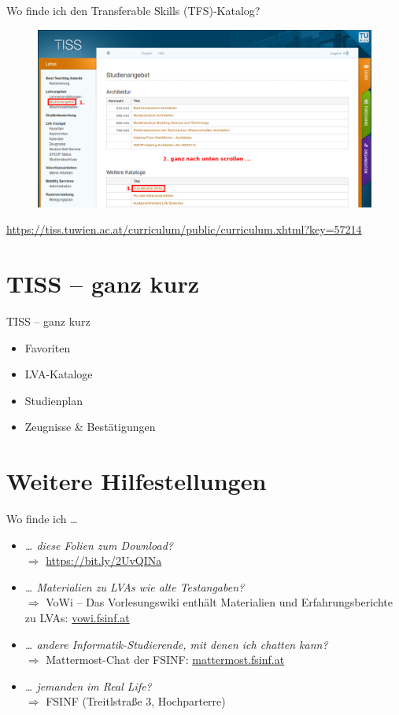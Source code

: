 \documentclass{beamer}
\begin{document}
\begin{frame}{Wo finde ich den Transferable Skills (TFS)-Katalog?}
    \begin{figure}[htp]
        \includegraphics[width=1.0\textwidth]{tiss_tfs.png}
    \end{figure}
     \url{https://tiss.tuwien.ac.at/curriculum/public/curriculum.xhtml?key=57214}
\end{frame}

\section{TISS -- ganz kurz}
\begin{frame}{TISS -- ganz kurz}
    \begin{itemize}
        \item Favoriten
        \item LVA-Kataloge
        \item Studienplan
        \item Zeugnisse \& Bestätigungen
    \end{itemize}
\end{frame}

\section{Weitere Hilfestellungen}
\begin{frame}{Wo finde ich \ldots}
    \begin{itemize}
        \item \textit{\ldots{} diese Folien zum Download?} \\
              $\Rightarrow$ \url{https://bit.ly/2UvQINa}
        \item \textit{\ldots{} Materialien zu LVAs wie alte Testangaben?} \\
              $\Rightarrow$ VoWi -- Das Vorlesungswiki enthält Materialien und
              Erfahrungsberichte zu LVAs: \url{vowi.fsinf.at}
        \item \textit{\ldots{} andere Informatik-Studierende, mit denen ich
              chatten kann?} \\
              $\Rightarrow$ Mattermost-Chat der FSINF: \url{mattermost.fsinf.at}
        \item \textit{\ldots{} jemanden im Real Life?} \\
              $\Rightarrow$ FSINF (Treitlstraße 3, Hochparterre)
    \end{itemize}
\end{frame}
\end{document}
